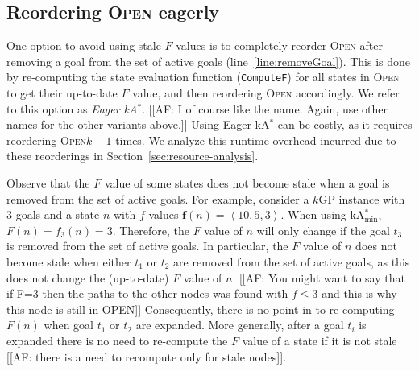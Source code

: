 \documentclass[twoside,11pt]{article}
\newcommand{\kgs}{$k$GP\xspace}
\newcommand{\kastar}{kA$^*$\xspace}
\newcommand{\kastarvar}[1]{\textup{kA}$^*_{#1}$\xspace}
\newcommand{\kastarmin}{\kastarvar{\min}}
\newcommand{\tuple}[1]{\ensuremath{\left \langle #1 \right \rangle }}
\newcommand{\open}{\textsc{Open}\xspace}
\newcommand{\vect}[1]{\mathbf{#1}}
\begin{document}
\subsection{Reordering \open eagerly}
\label{sec:eager}
One option to avoid using stale $F$ values is to completely reorder \open after removing a goal from the set of active goals (line~\ref{line:removeGoal}).
This is done by re-computing the state evaluation function (\texttt{ComputeF}) for all states in \open to get their up-to-date $F$ value, and then reordering \open accordingly.
We refer to this option as \emph{Eager \kastar}. [[AF: I of course like the name. Again, use other names for the other variants above.]]
Using Eager \kastar can be costly, as it requires reordering \open $k-1$ times. 
We analyze this runtime overhead incurred due to these reorderings in Section~\ref{sec:resource-analysis}.

Observe that the $F$ value of some states does not become stale when a goal is removed from the set of active goals.
For example, consider a \kgs instance with 3 goals and a state $n$ with $f$ values $\vect{f}(n)= \tuple{10, 5, 3}$.
When using \kastarmin, $F(n)=f_3(n)=3$.
Therefore, the $F$ value of $n$ will only change if the goal $t_3$ is removed from the set of active goals.
In particular, the $F$ value of $n$ does not become stale when either $t_1$ or $t_2$ are removed from the set of active goals, as this does not change the (up-to-date) $F$ value of $n$. [[AF: You might want to say that if F=3 then the paths to the other nodes was found with $f \leq 3$ and this is why this node is still in OPEN]]
Consequently, there is no point in to re-computing $F(n)$ when goal $t_1$ or $t_2$ are expanded. More generally, after a goal $t_i$ is expanded there is no need to re-compute the $F$ value of a state if it is not stale  [[AF: there is a need to recompute only for stale nodes]]. %
\end{document}
